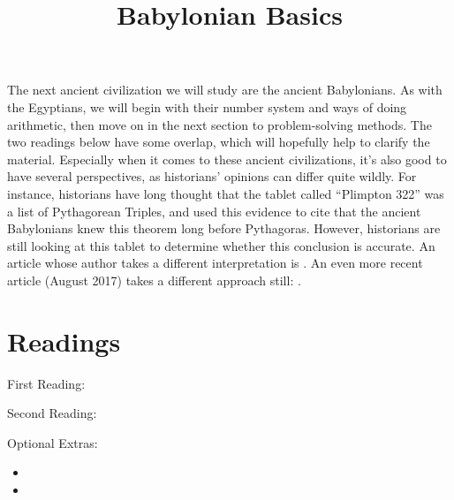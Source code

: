 \documentclass{ximera}
\title{Babylonian Basics}
\begin{document}
\begin{abstract}
\end{abstract}
\maketitle

The next ancient civilization we will study are the ancient Babylonians.  As with the Egyptians, we will begin with their number system and ways of doing arithmetic, then move on in the next section to problem-solving methods.  The two readings below have some overlap, which will hopefully help to clarify the material.  Especially when it comes to these ancient civilizations, it's also good to have several perspectives, as historians' opinions can differ quite wildly.  For instance, historians have long thought that the tablet called ``Plimpton 322'' was a list of Pythagorean Triples, and used this evidence to cite that the ancient Babylonians knew this theorem long before Pythagoras.  However, historians are still looking at this tablet to determine whether this conclusion is accurate.  An article whose author takes a different interpretation is .  An even more recent article (August 2017) takes a different approach still: .




\section{Readings}

First Reading:  

Second Reading: 

Optional Extras: 
\begin{itemize}
\item {}
\item {}
\end{itemize}
\end{document}
